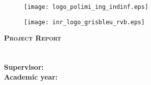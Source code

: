 

\AddToShipoutPicture{\BackgroundPic}
\begin{figure}
    \begin{minipage}{0.4\textwidth}
    \hspace{-0.6cm}\texttt{[image: logo\_polimi\_ing\_indinf.eps]}
    \end{minipage}
    \begin{minipage}{0.5\textwidth}
        \texttt{[image: inr\_logo\_grisbleu\_rvb.eps]}
    \end{minipage}
\end{figure}

\vspace{-1mm}

\fontsize{0.3cm}{0.5cm}\selectfont \bfseries \textsc{\color{bluePoli} Project Report}\\

\vspace{-0.2cm}
\Large{\textbf{\color{bluePoli}{\title}}}\\

\vspace{-0.2cm}
\fontsize{0.3cm}{0.5cm}\selectfont \bfseries \textsc{\color{bluePoli} \course}\\



\vspace{-0.4cm}
\fontsize{0.3cm}{0.5cm}\selectfont \bfseries Supervisor: \textsc{\textbf{\advisor}}\\


\vspace{-0.4cm}
\fontsize{0.3cm}{0.5cm}\selectfont \bfseries Academic year: \textsc{\textbf{\YEAR}}

\small \normalfont

\vspace{11pt}

